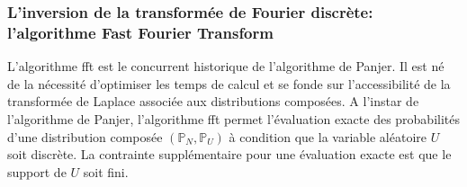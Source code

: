 \subsubsection{L\rq{}inversion de la transformée de Fourier discrète: l\rq{}algorithme Fast Fourier Transform}
L\rq{}algorithme \gls{fft} est le concurrent historique de l\rq{}algorithme de Panjer. Il est né de la nécessité d\rq{}optimiser les temps de calcul et se fonde sur l\rq{}accessibilité de la transformée de Laplace associée aux distributions composées. A l\rq{}instar de l\rq{}algorithme de Panjer, l\rq{}algorithme \gls{fft} permet l\rq{}évaluation exacte des probabilités d\rq{}une distribution composée $(\mathbb{P}_{N},\mathbb{P}_{U})$ à condition que la variable aléatoire $U$ soit discrète. La contrainte supplémentaire pour une évaluation exacte est que le support de $U$ soit fini.\\

